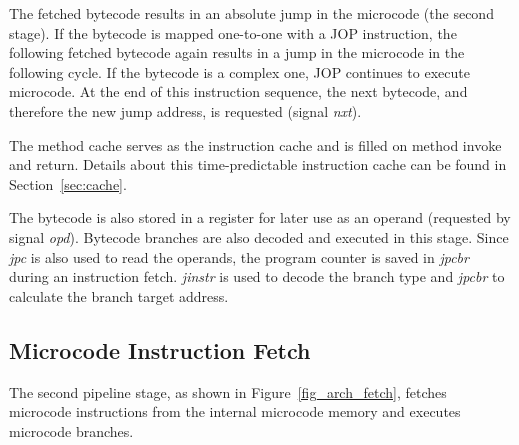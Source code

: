 The fetched bytecode results in an absolute jump in the microcode
(the second stage). If the bytecode is mapped one-to-one with a JOP
instruction, the following fetched bytecode again results in a jump
in the microcode in the following cycle. If the bytecode is a complex
one, JOP continues to execute microcode. At the end of this
instruction sequence, the next bytecode, and therefore the new jump
address, is requested (signal \emph{nxt}).

The method cache serves as the instruction cache and is filled on
method invoke and return. Details about this time-predictable
instruction cache can be found in Section~\ref{sec:cache}.

The bytecode is also stored in a register for later use as an
operand (requested by signal \emph{opd}). Bytecode branches are also
decoded and executed in this stage. Since \emph{jpc} is also used to
read the operands, the program counter is saved in \emph{jpcbr}
during an instruction fetch. \emph{jinstr} is used to decode the
branch type and \emph{jpcbr} to calculate the branch target address.

\subsection{Microcode Instruction Fetch}

The second pipeline stage, as shown in Figure~\ref{fig_arch_fetch},
fetches microcode instructions from the internal microcode memory and
executes microcode branches.

